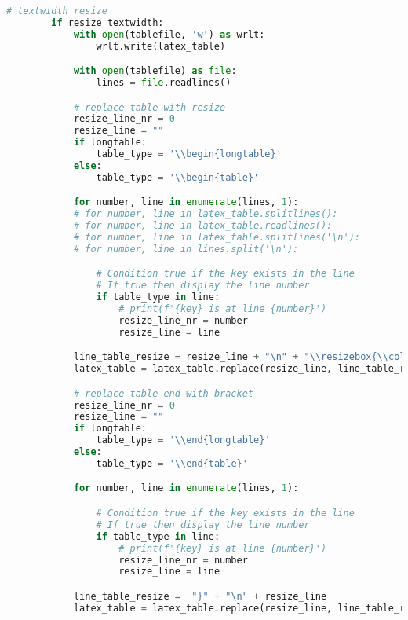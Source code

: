 \begin{lstlisting}[language=python, caption=Python LaTex - pandas\_dataframe\_to\_latex\_table.py CSV - LaTex Tabelle,captionpos=b,label={lst:Python LaTex - pandas_dataframe_to_latex_table},breaklines=true]
        # textwidth resize
        if resize_textwidth:
            with open(tablefile, 'w') as wrlt:
                wrlt.write(latex_table)

            with open(tablefile) as file:
                lines = file.readlines()

            # replace table with resize
            resize_line_nr = 0
            resize_line = ""
            if longtable:
                table_type = '\\begin{longtable}'
            else:
                table_type = '\\begin{table}'

            for number, line in enumerate(lines, 1):
            # for number, line in latex_table.splitlines():
            # for number, line in latex_table.readlines():
            # for number, line in latex_table.splitlines('\n'):
            # for number, line in lines.split('\n'):

                # Condition true if the key exists in the line
                # If true then display the line number
                if table_type in line:
                    # print(f'{key} is at line {number}')
                    resize_line_nr = number
                    resize_line = line

            line_table_resize = resize_line + "\n" + "\\resizebox{\\columnwidth}{!}{%"
            latex_table = latex_table.replace(resize_line, line_table_resize)

            # replace table end with bracket
            resize_line_nr = 0
            resize_line = ""
            if longtable:
                table_type = '\\end{longtable}'
            else:
                table_type = '\\end{table}'

            for number, line in enumerate(lines, 1):

                # Condition true if the key exists in the line
                # If true then display the line number
                if table_type in line:
                    # print(f'{key} is at line {number}')
                    resize_line_nr = number
                    resize_line = line

            line_table_resize =  "}" + "\n" + resize_line
            latex_table = latex_table.replace(resize_line, line_table_resize)


\end{lstlisting}
